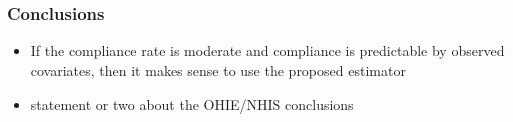 \documentclass{beamer}
\begin{document}
\section[Conclusions]{}

\begin{frame}
\frametitle{Conclusions}
\begin{itemize}
\item If the compliance rate is moderate and compliance is predictable by observed covariates, then it makes sense to use the proposed estimator %
\item statement or two about the OHIE/NHIS conclusions
\end{itemize}
\end{frame}

\section[References]{}

\begin{frame}
\begin{singlespace}
\begin{tiny}


\end{tiny}
\end{singlespace}
\itemize
\end{frame}

		
\end{document}
